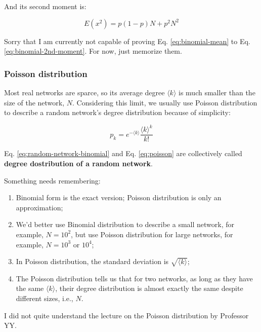 \documentclass[
]{krantz}
\makeatletter
\newenvironment{kframe}{%
\medskip{}
\setlength{\fboxsep}{.8em}
 \def\at@end@of@kframe{}%
 \ifinner\ifhmode%
  \def\at@end@of@kframe{\end{minipage}}%
  \begin{minipage}{\columnwidth}%
 \fi\fi%
 \def\FrameCommand##1{\hskip\@totalleftmargin \hskip-\fboxsep
 \colorbox{shadecolor}{##1}\hskip-\fboxsep
     \hskip-\linewidth \hskip-\@totalleftmargin \hskip\columnwidth}%
 \MakeFramed {\advance\hsize-\width
   \@totalleftmargin\z@ \linewidth\hsize
   \@setminipage}}%
 {\par\unskip\endMakeFramed%
 \at@end@of@kframe}
\newenvironment{rmdblock}[1]
  {
  \begin{itemize}
  \renewcommand{\labelitemi}{
    \raisebox{-.7\height}[0pt][0pt]{
      {\setkeys{Gin}{width=3em,keepaspectratio}\texttt{[image: images/\#1]}}
    }
  }
  \setlength{\fboxsep}{1em}
  \begin{kframe}
  \item
  }
  {
  \end{kframe}
  \end{itemize}
  }
\newenvironment{rmdreminder}
  {\begin{rmdblock}{reminder}}
  {\end{rmdblock}}
\makeatother
\begin{document}
And its second moment is:

\begin{equation}
  E(x^2) = p(1-p)N + p^2N^2 \label{eq:binomial-2nd-moment}
\end{equation}

Sorry that I am currently not capable of proving Eq. \eqref{eq:binomial-mean} to Eq. \eqref{eq:binomial-2nd-moment}. For now, just memorize them.

\hypertarget{poisson-distribution}{%
\subsubsection{Poisson distribution}\label{poisson-distribution}}

Most real networks are sparce, so its average degree \(\langle k \rangle\) is much smaller than the size of the network, \(N\). Considering this limit, we usually use Poisson distribution to describe a random network's degree distribution because of simplicity:

\begin{equation}
  p_k = e^{-\langle k \rangle}\frac{\langle k \rangle^k}{k!} \label{eq:poisson}
\end{equation}

Eq. \eqref{eq:random-network-binomial} and Eq. \eqref{eq:poisson} are collectively called \textbf{degree dostribution of a random network}.

Something needs remembering:

\begin{enumerate}
\def\labelenumi{\arabic{enumi}.}
\item
  Binomial form is the exact version; Poisson distribution is only an approximation;
\item
  We'd better use Binomial distribution to describe a small network, for example, \(N = 10^2\), but use Poisson distribution for large networks, for example, \(N = 10^3\) or \(10^4\);
\item
  In Poisson distribution, the standard deviation is \(\sqrt {\langle k \rangle}\);
\item
  The Poisson distribution tells us that for two networks, as long as they have the same \(\langle k \rangle\), their degree distribution is almost exactly the same despite different sizes, i.e., \(N\).
\end{enumerate}

\begin{rmdreminder}
I did not quite understand the lecture on the Poisson distribution by Professor YY.\\
\end{rmdreminder}
\end{document}
